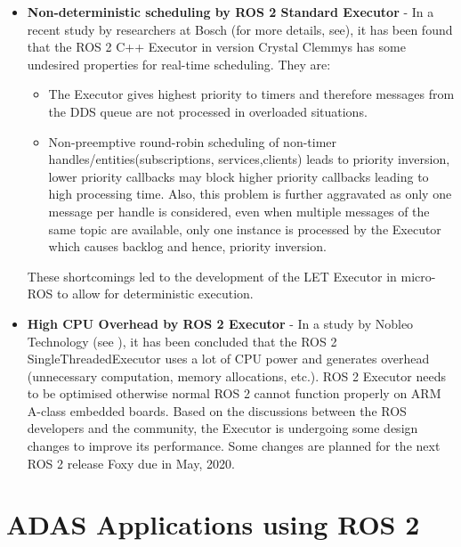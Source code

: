\documentclass[%
xelatex,
	oneside,		%
	12pt,			%
	parskip=half,	%
	abstracton,
	chapterprefix=true%
    appendixprefix=true]
{scrbook}
\begin{document}
\begin{itemize}
\begin{center}
[Inverted Pendulum Setup]{Inverted Pendulum Setup\cite{deadline}}
\label{fig:inverpen}
\end{center}
\item {\bfseries Non-deterministic scheduling by ROS 2 Standard Executor} - In a recent study by researchers at Bosch (for more details, see\cite{ingo}), it has been found that the ROS 2 C++ Executor in version Crystal Clemmys has some undesired properties for real-time scheduling. They are:
\begin{itemize}
\item The Executor gives highest priority to timers and therefore messages from the DDS queue are not processed in overloaded situations.
\item Non-preemptive round-robin scheduling of non-timer handles/entities(subscriptions, services,clients) leads to priority inversion, lower priority callbacks may block higher priority callbacks leading to high processing time. Also, this problem is further aggravated as only one message per handle is considered, even when multiple messages of the same topic are available, only one instance is processed by the Executor which causes backlog and hence, priority inversion. 
\end{itemize} 
These shortcomings led to the development of the LET Executor in micro-ROS to allow for deterministic execution.
\item {\bfseries High CPU Overhead by ROS 2 Executor} - In a study by Nobleo Technology (see \cite{nobleo}), it has been concluded that the ROS 2 SingleThreadedExecutor uses a lot of CPU power and generates overhead (unnecessary computation, memory allocations, etc.). ROS 2 Executor needs to be optimised otherwise normal ROS 2 cannot function properly on ARM A-class embedded boards. Based on the discussions between the ROS developers and the community, the Executor is undergoing some design changes to improve its performance. Some changes are planned for the next ROS 2 release Foxy due in May, 2020.
\end{itemize}


	\chapter{ADAS Applications using ROS 2}
		
\end{document}
